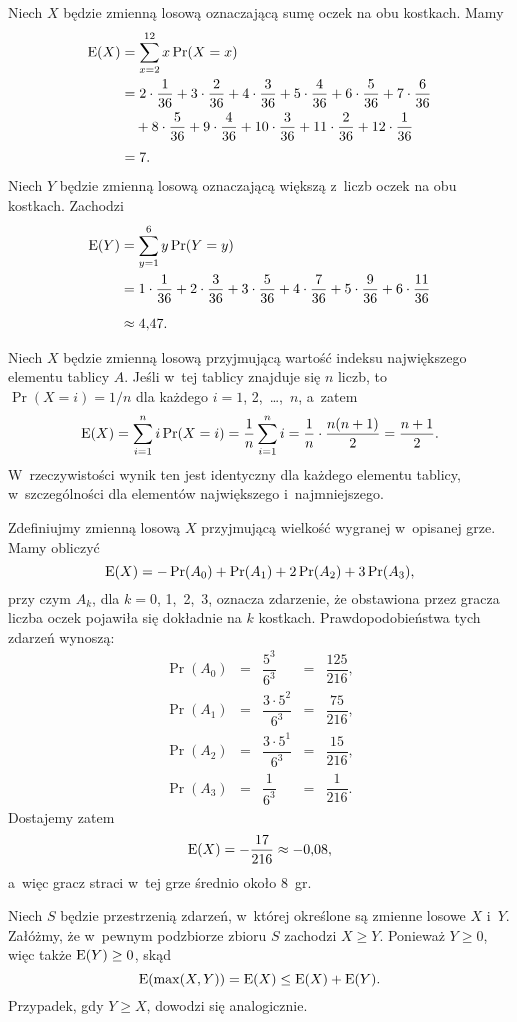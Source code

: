 \exercise %
Niech $X$ będzie zmienną losową oznaczającą sumę oczek na obu kostkach. Mamy
\begin{align*}
	\operatorname{E}(X) &= \sum_{x=2}^{12}x\Pr(X=x) \\
	&= 2\cdot\frac{1}{36}+3\cdot\frac{2}{36}+4\cdot\frac{3}{36}+5\cdot\frac{4}{36}+6\cdot\frac{5}{36}+7\cdot\frac{6}{36} \\
	&\quad {}+8\cdot\frac{5}{36}+9\cdot\frac{4}{36}+10\cdot\frac{3}{36}+11\cdot\frac{2}{36}+12\cdot\frac{1}{36} \\[1mm]
	&= 7.
\end{align*}
Niech $Y$ będzie zmienną losową oznaczającą większą z~liczb oczek na obu kostkach. Zachodzi
\begin{align*}
	\operatorname{E}(Y) &= \sum_{y=1}^{6}y\Pr(Y=y) \\
	&= 1\cdot\frac{1}{36}+2\cdot\frac{3}{36}+3\cdot\frac{5}{36}+4\cdot\frac{7}{36}+5\cdot\frac{9}{36}+6\cdot\frac{11}{36} \\[2mm]
	&\approx 4{,}47.
\end{align*}

\exercise %
Niech $X$ będzie zmienną losową przyjmującą wartość indeksu największego elementu tablicy $A$. Jeśli w~tej tablicy znajduje się $n$ liczb, to $\Pr(X=i)=1/n$ dla każdego $i=1$, 2,~\dots,~$n$, a~zatem
\[
	\operatorname{E}(X) = \sum_{i=1}^ni\Pr(X=i) = \frac{1}{n}\sum_{i=1}^ni = \frac{1}{n}\cdot\frac{n(n+1)}{2} = \frac{n+1}{2}.
\]
W~rzeczywistości wynik ten jest identyczny dla każdego elementu tablicy, w~szczególności dla elementów największego i~najmniejszego.

\exercise %
Zdefiniujmy zmienną losową $X$ przyjmującą wielkość wygranej w~opisanej grze. Mamy obliczyć
\[
	\operatorname{E}(X) = -\Pr(A_0)+\Pr(A_1)+2\Pr(A_2)+3\Pr(A_3),
\]
przy czym $A_k$, dla $k=0$, 1,~2,~3, oznacza zdarzenie, że obstawiona przez gracza liczba oczek pojawiła się dokładnie na $k$ kostkach. Prawdopodobieństwa tych zdarzeń wynoszą:
\[
	\begin{array}{ccccc}
	\Pr(A_0) &=& \dfrac{5^3}{6^3} &=& \dfrac{125}{216}, \\[3mm]
	\Pr(A_1) &=& \dfrac{3\cdot 5^2}{6^3} &=& \dfrac{75}{216}, \\[3mm]
	\Pr(A_2) &=& \dfrac{3\cdot 5^1}{6^3} &=& \dfrac{15}{216}, \\[3mm]
	\Pr(A_3) &=& \dfrac{1}{6^3} &=& \dfrac{1}{216}.
	\end{array}
\]
Dostajemy zatem
\[
	\operatorname{E}(X) = -\dfrac{17}{216} \approx -0{,}08,
\]
a~więc gracz straci w~tej grze średnio około 8~gr.

\exercise %
Niech $S$ będzie przestrzenią zdarzeń, w~której określone są zmienne losowe $X$ i~$Y$. Załóżmy, że w~pewnym podzbiorze zbioru $S$ zachodzi $X\ge Y$. Ponieważ $Y\ge0$, więc także $\operatorname{E}(Y)\ge0$, skąd
\[
    \operatorname{E}(\max(X,Y)) = \operatorname{E}(X) \le \operatorname{E}(X)+\operatorname{E}(Y).
\]
Przypadek, gdy $Y\ge X$, dowodzi się analogicznie.

